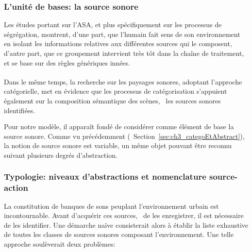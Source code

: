 \subsubsection{L'unité de bases: la source sonore}

Les études portant sur l'ASA, et plus spécifiquement sur les processus de ségrégation, montrent, d'une part, que l'humain fait sens de son environnement en isolant les informations relatives aux différentes sources qui le composent, d'autre part, que ce groupement intervient très tôt dans la chaîne de traitement, et se base sur des règles génériques innées.\\

 \\ 

Dans le même temps, la recherche sur les paysages sonores, adoptant l’approche catégorielle, met en évidence que les processus de catégorisation s'appuient également sur la composition sémantique des scènes, \ie~les sources sonores identifiées. 

Pour notre modèle, il apparaît fondé de considérer comme élément de base la source sonore. Comme vu précédemment (\cf~Section~\ref{sec:ch3_categoEtAbstract}), la notion de source sonore est variable, un même objet pouvant être reconnu suivant plusieurs degrés d'abstraction.

\subsubsection{Typologie: niveaux d'abstractions et nomenclature source-action}
\label{sec:ch4_sourceAction}

La constitution de banques de sons peuplant l'environnement urbain est incontournable. Avant d'acquérir ces sources, \ie~de les enregistrer, il est nécessaire de les identifier. Une démarche naïve consisterait alors à établir la liste exhaustive de toutes les classes de sources sonores composant l'environnement. Une telle approche soulèverait deux problèmes:

